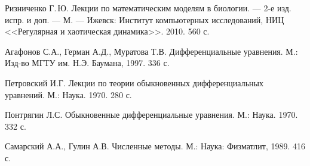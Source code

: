 \documentclass[12pt,a4paper]{article}
\begin{document}
    \newpage

    \begin{thebibliography}{9}

         Ризниченко Г.\,Ю. Лекции по математическим моделям в биологии. --- 2-е изд. испр. и доп. --- М. --- Ижевск: Институт компьютерных исследований, НИЦ <<Регулярная и хаотическая динамика>>. 2010. 560 с.

         Агафонов С.А., Герман А.Д., Муратова Т.В. Дифференциальные уравнения. М.: Изд-во МГТУ им. Н.Э. Баумана, 1997. 336 с.

         Петровский И.Г. Лекции по теории обыкновенных дифференциальных уравнений. М.: Наука. 1970. 280 с.

         Понтрягин Л.С. Обыкновенные дифференциальные уравнения. М.: Наука. 1970. 332 с.

         Самарский А.А., Гулин А.В. Численные методы. М.: Наука: Физматлит, 1989. 416 с.

    \end{thebibliography}

    
\end{document}
